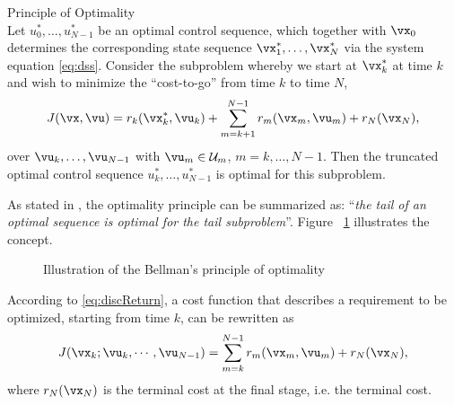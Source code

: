 \begin{teo}{Principle of Optimality \citep{bertsekas2019}
\\} \label{teo:bellmanopt}
    Let $u^*_0, \dots, u^*_{N-1}$ be an optimal control sequence, which together with $\vx_0$ determines the corresponding state sequence $\vx_1^*, \dots, \vx_N^*$ via the system equation \eqref{eq:dss}. Consider the subproblem whereby we start at $\vx_k^*$ at time $k$ and wish to minimize the  ``cost-to-go'' from time $k$ to time  $N$,
     \begin{equation}
       J(\vx,\vu) = r_k(\vx_k^*,\vu_k) + \sum_{m=k+1}^{N-1} r_m(\vx_m,\vu_m) + r_N(\vx_N)
    \label{eq:optPrin},
    \end{equation}
    over $\vu_k, \dots, \vu_{N-1}$ with $\vu_m \in \mathcal{U}_m$, $m=k,\dots,N-1$. Then the truncated optimal control sequence  $u^*_k, \dots, u^*_{N-1}$ is optimal for this subproblem.
\end{teo}
As stated in \cite{bertsekas2019}, the optimality principle can be summarized as: ``\textit{the tail of an optimal sequence is optimal for the tail subproblem}''. Figure
~\ref{fig:BellmanTail} illustrates the concept.
\begin{figure}[htpb]
    \centering
    
    \caption{Illustration of the Bellman's principle of optimality }%
    \label{fig:BellmanTail}
\end{figure}
According to \eqref{eq:discReturn}, a cost function that describes a requirement to be optimized, starting from time $k$, can be rewritten as 
\begin{equation}
    J(\vx_k;\vu_k, \cdots, \vu_{N-1}) = \sum_{m=k}^{N-1} r_m(\vx_m,\vu_m) + r_N(\vx_N)
\label{eq:costFunctiok},
\end{equation}
where $r_N(\vx_N)$ is the terminal cost at the final stage, i.e. the terminal cost.

